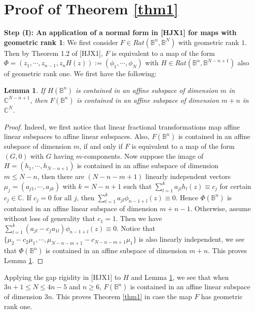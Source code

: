 \documentclass[12pt]{article}
\numberwithin{equation}{section}
\def\BB{{\mathbb B}}
\def\CC{{\mathbb C}}
\newtheorem{lemma}[theorem]{Lemma}
\begin{document}
\section{Proof of Theorem \ref{thm1}}
{\bf Step (I): An application of a normal form in [HJX1] for maps
with geometric rank 1}:
  We first consider $F\in Rat({\BB}^n,{\BB}^N)$ with
geometric rank $1$. Then by Theorem 1.2 of [HJX1], $F$ is equivalent
to a map of the form $\Phi=(z_1,\cdots,
z_{n-1},z_nH(z)):=(\phi_1,\cdots,\phi_N)$ with $H\in
Rat({\BB}^n,{\BB}^{N-n+1})$ also of geometric rank one. We first
have the following:


\begin{lemma}\label{claim}
 If $H({\BB}^n)$ is contained in an affine subspace of
dimension $m$ in ${\CC}^{N-n+1}$, then $F({\BB}^n)$ is contained in
an affine subspace of dimension $m+n$ in ${\CC}^{N}$.
\end{lemma}

\begin{proof}
Indeed, we first notice that linear fractional transformations map
affine linear subspaces to affine linear subspaces. Also,
$F({\BB}^n)$ is contained in an affine subspace of dimension $m$, if
and only if $F$ is equivalent to a map of the form $(G,0)$ with $G$
having $m$-components.
  Now suppose the image of $H=(h_1,\cdots,
h_{N-n+1})$ is contained in an affine subspace of dimension $m\le N-n$,
then there are $(N-n-m+1)$ linearly independent vectors
$\mu_j=(a_{j1},\cdots,a_{jk})$ with $k=N-n+1$ such that
$\sum_{l=1}^{k}a_{jl}h_l(z)\equiv c_j$ for certain $c_j \in {\CC}$.
If $c_j=0$ for all $j$, then
$\sum_{l=1}^{k}a_{jl}\phi_{n-1+l}(z)\equiv 0$. Hence $\Phi({\BB}^n)$
is contained in an affine linear subspace of dimension $m+n-1$.
Otherwise, assume without loss of generality that $c_1=1$. Then we
have $\sum_{l=1}^{k}(a_{jl}- c_j a_{1l})\phi_{n-1+l}(z)\equiv 0$.
Notice that
$\{\mu_2-c_2\mu_1,\cdots,\mu_{N-n-m+1}-c_{N-n-m+1}\mu_1\}$ is also
linearly independent, we see that  $\Phi({\BB}^n)$ is contained in
an affine subspace of dimension $m+n$. This proves Lemma
\ref{claim}.
\end{proof}


\medskip
Applying the gap rigidity in [HJX1] {to $H$} and Lemma \ref{claim},
we  see that when $3n+1\le N\le 4n-5$ and $n\ge 6$, $F({\BB}^n)$ is
contained in an affine linear subspace of dimension $3n$.
This proves
Theorem \ref{thm1} in case the map $F$ has geometric rank one.
\end{document}
